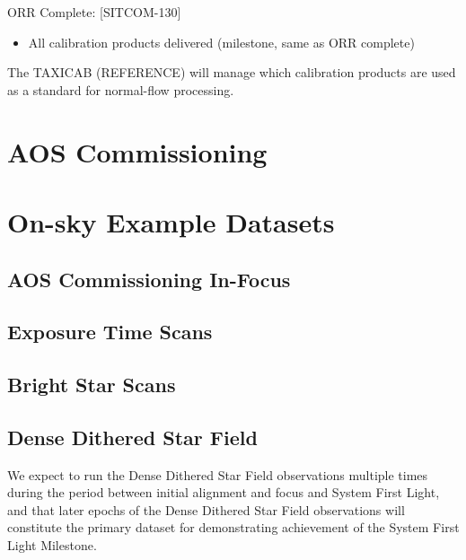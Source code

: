 \documentclass[SE,authoryear,toc,lsstdraft]{lsstdoc}
\begin{document}
ORR Complete: [SITCOM-130]

\begin{itemize}

  \item All calibration products delivered (milestone, same as ORR complete)

\end{itemize}

The TAXICAB (REFERENCE) will manage which calibration products are used as a standard for normal-flow processing.

\section{AOS Commissioning}

\section{On-sky Example Datasets}

\subsection{AOS Commissioning In-Focus}



\subsection{Exposure Time Scans}



\subsection{Bright Star Scans}



\subsection{Dense Dithered Star Field}

We expect to run the Dense Dithered Star Field observations multiple times during the period between initial alignment and focus and System First Light, and that later epochs of the Dense Dithered Star Field observations will constitute the primary dataset for demonstrating achievement of the System First Light Milestone.


\end{document}
